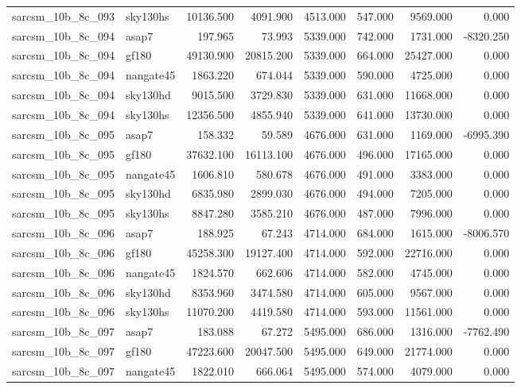 \begin{tabular}{llrrrrrr}
sarcsm\_10b\_8c\_093 & sky130hs & 10136.500 & 4091.900 & 4513.000 & 547.000 & 9569.000 & 0.000 \\
sarcsm\_10b\_8c\_094 & asap7 & 197.965 & 73.993 & 5339.000 & 742.000 & 1731.000 & -8320.250 \\
sarcsm\_10b\_8c\_094 & gf180 & 49130.900 & 20815.200 & 5339.000 & 664.000 & 25427.000 & 0.000 \\
sarcsm\_10b\_8c\_094 & nangate45 & 1863.220 & 674.044 & 5339.000 & 590.000 & 4725.000 & 0.000 \\
sarcsm\_10b\_8c\_094 & sky130hd & 9015.500 & 3729.830 & 5339.000 & 631.000 & 11668.000 & 0.000 \\
sarcsm\_10b\_8c\_094 & sky130hs & 12356.500 & 4855.940 & 5339.000 & 641.000 & 13730.000 & 0.000 \\
sarcsm\_10b\_8c\_095 & asap7 & 158.332 & 59.589 & 4676.000 & 631.000 & 1169.000 & -6995.390 \\
sarcsm\_10b\_8c\_095 & gf180 & 37632.100 & 16113.100 & 4676.000 & 496.000 & 17165.000 & 0.000 \\
sarcsm\_10b\_8c\_095 & nangate45 & 1606.810 & 580.678 & 4676.000 & 491.000 & 3383.000 & 0.000 \\
sarcsm\_10b\_8c\_095 & sky130hd & 6835.980 & 2899.030 & 4676.000 & 494.000 & 7205.000 & 0.000 \\
sarcsm\_10b\_8c\_095 & sky130hs & 8847.280 & 3585.210 & 4676.000 & 487.000 & 7996.000 & 0.000 \\
sarcsm\_10b\_8c\_096 & asap7 & 188.925 & 67.243 & 4714.000 & 684.000 & 1615.000 & -8006.570 \\
sarcsm\_10b\_8c\_096 & gf180 & 45258.300 & 19127.400 & 4714.000 & 592.000 & 22716.000 & 0.000 \\
sarcsm\_10b\_8c\_096 & nangate45 & 1824.570 & 662.606 & 4714.000 & 582.000 & 4745.000 & 0.000 \\
sarcsm\_10b\_8c\_096 & sky130hd & 8353.960 & 3474.580 & 4714.000 & 605.000 & 9567.000 & 0.000 \\
sarcsm\_10b\_8c\_096 & sky130hs & 11070.200 & 4419.580 & 4714.000 & 593.000 & 11561.000 & 0.000 \\
sarcsm\_10b\_8c\_097 & asap7 & 183.088 & 67.272 & 5495.000 & 686.000 & 1316.000 & -7762.490 \\
sarcsm\_10b\_8c\_097 & gf180 & 47223.600 & 20047.500 & 5495.000 & 649.000 & 21774.000 & 0.000 \\
sarcsm\_10b\_8c\_097 & nangate45 & 1822.010 & 666.064 & 5495.000 & 574.000 & 4079.000 & 0.000 \\

\end{tabular}

